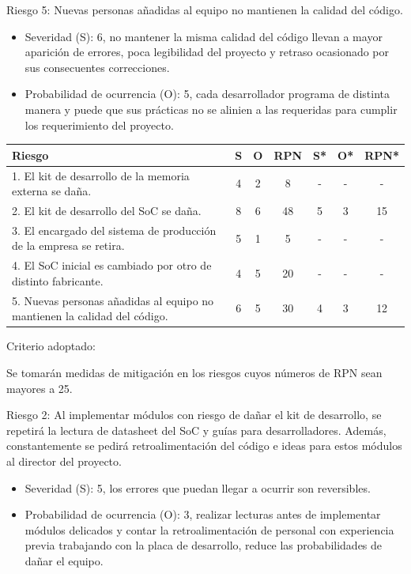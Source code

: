 \documentclass[
11pt, %
]{charter}
\begin{document}
Riesgo 5: Nuevas personas añadidas al equipo no mantienen la calidad del código. 
\begin{itemize}
	\item Severidad (S): 6, no mantener la misma calidad del código llevan a mayor aparición de errores, poca legibilidad del proyecto y retraso ocasionado por sus consecuentes correcciones.
	\item Probabilidad de ocurrencia (O): 5, cada desarrollador programa de distinta manera y puede que sus prácticas no se alinien a las requeridas para cumplir los requerimiento del proyecto.  
\end{itemize}

\begin{table}[htpb]
\centering
\begin{tabularx}{\linewidth}{@{}|X|c|c|c|c|c|c|@{}}
\hline
\rowcolor[HTML]{C0C0C0} 
Riesgo & S & O & RPN & S* & O* & RPN* \\ \hline
1. El kit de desarrollo de la memoria externa se daña.       & 4 &  2 & 8    & -   &  -  & -     \\ \hline
2. El kit de desarrollo del SoC se daña. & 8 & 6 & 48 &  5  &  3  &  15    \\ \hline
3. El encargado del sistema de producción de la empresa se retira.& 5 & 1 & 5  & -   & -   & -     \\ \hline
4. El SoC inicial es cambiado por otro de distinto fabricante. & 4 & 5 & 20 & -   & -   & -     \\ \hline
5. Nuevas personas añadidas al equipo no mantienen la calidad del código. & 6 & 5 & 30 & 4 & 3 & 12     \\ \hline
\end{tabularx}%
\end{table}

Criterio adoptado:

Se tomarán medidas de mitigación en los riesgos cuyos números de RPN sean mayores a 25.

Riesgo 2: Al implementar módulos con riesgo de dañar el kit de desarrollo, se repetirá la lectura de datasheet del SoC y guías para desarrolladores. Además, constantemente se pedirá retroalimentación del código e ideas para estos módulos al director del proyecto.
\begin{itemize}
	\item Severidad (S): 5, los errores que puedan llegar a ocurrir son reversibles.  
	\item Probabilidad de ocurrencia (O): 3, realizar lecturas antes de implementar módulos delicados y contar la retroalimentación de personal con experiencia previa trabajando con la placa de desarrollo, reduce las probabilidades de dañar el equipo.
\end{itemize}
\end{document}
